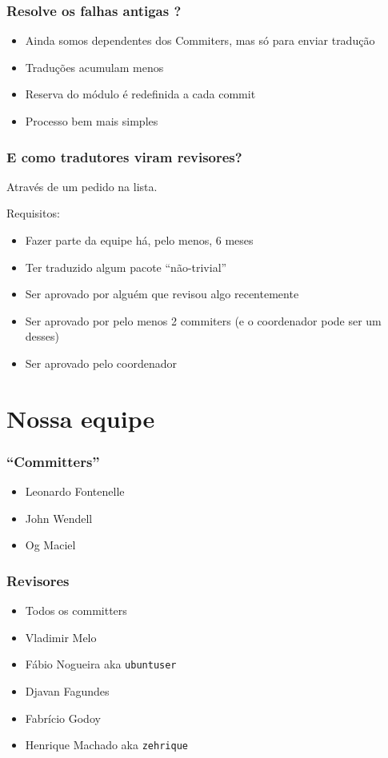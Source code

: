 \documentclass{beamer}
\begin{document}
\begin{frame}
    \frametitle{Resolve os falhas antigas ?}
    \begin{itemize}[<+->]
        \item Ainda somos dependentes dos Commiters, mas só para enviar tradução
        \item Traduções acumulam menos
        \item Reserva do módulo é redefinida a cada commit
        \item Processo bem mais simples
    \end{itemize}
\end{frame}

\begin{frame}
    \frametitle{E como tradutores viram revisores?}
    Através de um pedido na lista.

    Requisitos:
    \begin{itemize}[<+->]
        \item Fazer parte da equipe há, pelo menos, 6 meses
        \item Ter traduzido algum pacote ``não-trivial''
        \item Ser aprovado por alguém que revisou algo recentemente
        \item Ser aprovado por pelo menos 2 commiters (e o coordenador pode ser um desses)
        \item Ser aprovado pelo coordenador
    \end{itemize}
\end{frame}

\section{Nossa equipe}

\begin{frame}
    \frametitle{``Committers''}
    \begin{itemize}
        \item Leonardo Fontenelle 
        \item John Wendell
        \item Og Maciel
    \end{itemize}
\end{frame}

\begin{frame}[fragile]
    \frametitle{Revisores}
    \begin{itemize}
        \item Todos os committers
        \item Vladimir Melo 
        \item Fábio Nogueira aka \verb#ubuntuser#
        \item Djavan Fagundes
        \item Fabrício Godoy
        \item Henrique Machado aka \verb#zehrique#    
    \end{itemize}
\end{frame}
\end{document}
